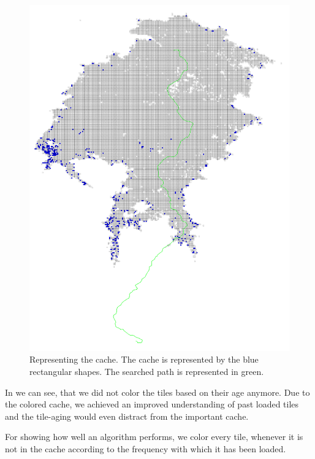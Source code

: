 \documentclass
[
    paper = a4,
    pagesize,
    12 pt,
    oneside,                       %
    open = right,
    DIV = calc,
    BCOR = 0 mm,                   %
    bibtotoc
]
{scrbook}
\begin{document}
\begin{figure}
    \includegraphics[width=\textwidth]{Images/vis-basic-cache.png}
\caption[]{Representing the cache. The cache is represented by the blue rectangular shapes. The searched path is represented in green.}
\label{fig:cache_coloring}
\end{figure}

In  we can see, that we did not color the tiles based on their age anymore.
Due to the colored cache, we achieved an improved understanding of past loaded tiles and the tile-aging would even distract from the important cache.

For showing how well an algorithm performs, we color every tile, whenever it is not in the cache according to the frequency with which it has been loaded.
\end{document}
